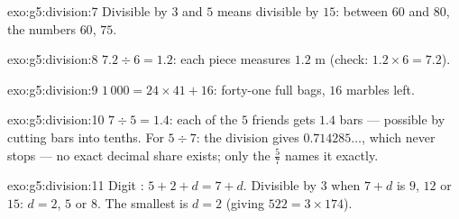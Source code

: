 \begin{solution}{exo:g5:division:7}
Divisible by $3$ and $5$ means divisible by $15$: between $60$ and
$80$, the numbers $60$, $75$.
\end{solution}

\begin{solution}{exo:g5:division:8}
$7.2 \div 6 = 1.2$: each piece measures $1.2$ m (check:
$1.2 \times 6 = 7.2$).
\end{solution}

\begin{solution}{exo:g5:division:9}
$1\,000 = 24 \times 41 + 16$: forty-one full bags, $16$ marbles
left.
\end{solution}

\begin{solution}{exo:g5:division:10}
$7 \div 5 = 1.4$: each of the $5$ friends gets $1.4$ bars ---
possible by cutting bars into tenths. For $5 \div 7$: the division
gives $0.714285\dots$, which never stops --- no exact decimal share
exists; only the  $\frac57$ names it exactly.
\end{solution}

\begin{solution}{exo:g5:division:11}
Digit : $5 + 2 + d = 7 + d$. Divisible by $3$ when $7 + d$ is
$9$, $12$ or $15$: $d = 2$, $5$ or $8$. The smallest is $d = 2$
(giving $522 = 3 \times 174$).
\end{solution}
